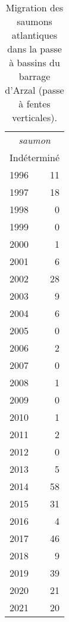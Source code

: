 \begin{table}[ht]
\centering
\begin{tabular}{lr}
  \toprule
  \multicolumn{2}{c}{\textit{saumon}}  \\
						\multicolumn{2}{c}{Indéterminé} \\ \midrule
1996 & 11 \\ 
  1997 & 18 \\ 
  1998 & 0 \\ 
  1999 & 0 \\ 
  2000 & 1 \\ 
  2001 & 6 \\ 
  2002 & 28 \\ 
  2003 & 9 \\ 
  2004 & 6 \\ 
  2005 & 0 \\ 
  2006 & 2 \\ 
  2007 & 0 \\ 
  2008 & 1 \\ 
  2009 & 0 \\ 
  2010 & 1 \\ 
  2011 & 2 \\ 
  2012 & 0 \\ 
  2013 & 5 \\ 
  2014 & 58 \\ 
  2015 & 31 \\ 
  2016 & 4 \\ 
  2017 & 46 \\ 
  2018 & 9 \\ 
  2019 & 39 \\ 
  2020 & 21 \\ 
  2021 & 20 \\ 
   \bottomrule
\end{tabular}
\caption{Migration des saumons atlantiques dans la passe à bassins du barrage
				d'Arzal (passe à fentes verticales).} 
\label{table_bilanannuel_sat}
\end{table}
